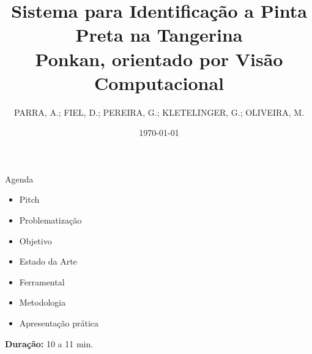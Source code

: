 \documentclass[aspectratio=169]{beamer}
\title{Sistema para Identificação a Pinta Preta na Tangerina \\Ponkan, orientado por Visão Computacional}
\subtitle{}
\author[DSM]{PARRA, A.; FIEL, D.; PEREIRA, G.; KLETELINGER, G.; OLIVEIRA, M.}
\institute{Desenvolvimento de Software Multiplataforma\\FATEC Registro}
\date{\today}
\begin{document}
\begin{frame}
  \vspace{0.8cm}
  \begin{center}
    
    \vspace{0.4cm}
    
    {\normalsize\bfseries\inserttitle}\par
    
    \vspace{0.2cm}
    
    {\tiny\insertauthor}\par
    
    \vspace{0.1cm}
    
    {\small\textcolor{azulComplementar}{\insertsubtitle}}\par
    
    \vspace{0.5cm}
    
    
    \vspace{0.3cm}
    
    {\scriptsize\insertinstitute}\par
    
    \vspace{0.01cm}
    
    {\tiny\textcolor{azulComplementar}{\insertdate}}\par
  \end{center}
\end{frame}

\begin{frame}[b]{Agenda}
  \begin{itemize}
    \item Pitch
    \item Problematização
    \item Objetivo
    \item Estado da Arte
    \item Ferramental
    \item Metodologia
    \item Apresentação prática
  \end{itemize}
  
  \vfill
  
  \hfill{\scriptsize \textbf{Duração:} 10 a 11 min.}
\end{frame}
\end{document}
